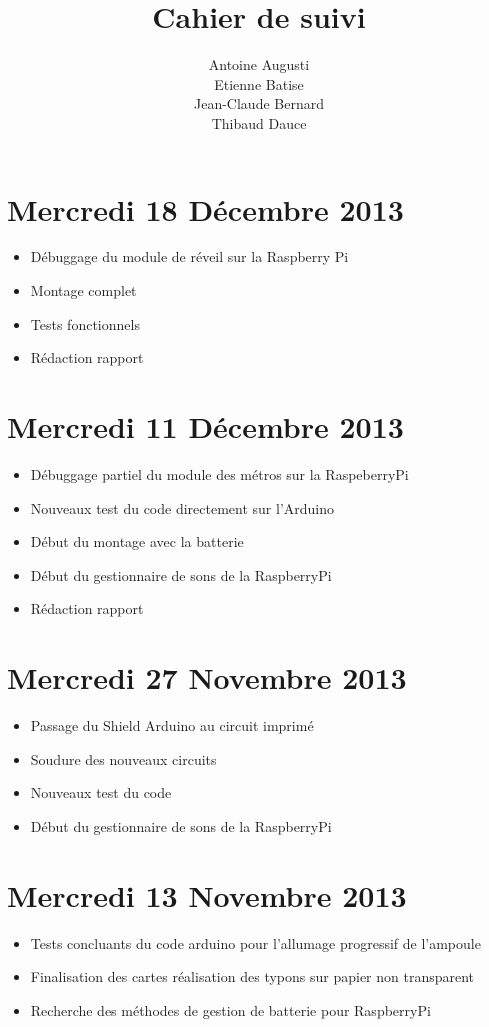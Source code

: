 \documentclass[a4paper, 12pt, french]{article}
\title{Cahier de suivi}
\author{Antoine Augusti\\ Etienne Batise\\ Jean-Claude Bernard\\ Thibaud Dauce}
\begin{document}
\maketitle
	\section*{Mercredi 18 Décembre 2013} %
	\begin{itemize}
		\item Débuggage du module de réveil sur la Raspberry Pi
		\item Montage complet
		\item Tests fonctionnels
		\item Rédaction rapport
	\end{itemize}

	\section*{Mercredi 11 Décembre 2013} %
	\begin{itemize}
		\item Débuggage partiel du module des métros sur la RaspeberryPi
		\item Nouveaux test du code directement sur l'Arduino
		\item Début du montage avec la batterie
		\item Début du gestionnaire de sons de la RaspberryPi
		\item Rédaction rapport
	\end{itemize}

	\section*{Mercredi 27 Novembre 2013} %
	\begin{itemize}
		\item Passage du Shield Arduino au circuit imprimé
		\item Soudure des nouveaux circuits			
		\item Nouveaux test du code
		\item Début du gestionnaire de sons de la RaspberryPi
	\end{itemize}


	\section*{Mercredi 13 Novembre 2013 } %
	\label{sec:mercredi_13_novembre_2013 }
	\begin{itemize}
		\item Tests concluants du code arduino pour l'allumage progressif de l'ampoule
		\item Finalisation des cartes réalisation des typons sur papier non transparent
		\item Recherche des méthodes de gestion de batterie pour RaspberryPi
	\end{itemize}
\end{document}
